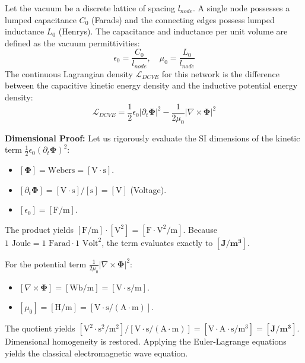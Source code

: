 \documentclass[11pt,a4paper]{article}
\begin{document}
Let the vacuum be a discrete lattice of spacing $l_{node}$. A single node possesses a lumped capacitance $C_0$ (Farads) and the connecting edges possess lumped inductance $L_0$ (Henrys). The capacitance and inductance per unit volume are defined as the vacuum permittivities:
\begin{equation}
    \epsilon_0 = \frac{C_0}{l_{node}}, \quad \mu_0 = \frac{L_0}{l_{node}}
\end{equation}
The continuous Lagrangian density $\mathcal{L}_{DCVE}$ for this network is the difference between the capacitive kinetic energy density and the inductive potential energy density:
\begin{equation}
    \mathcal{L}_{DCVE} = \frac{1}{2} \epsilon_0 |\partial_t \mathbf{\Phi}|^2 - \frac{1}{2\mu_0} |\nabla \times \mathbf{\Phi}|^2
\end{equation}

\textbf{Dimensional Proof:}
Let us rigorously evaluate the SI dimensions of the kinetic term $\frac{1}{2} \epsilon_0 (\partial_t \mathbf{\Phi})^2$:
\begin{itemize}
    \item $[\mathbf{\Phi}] = \text{Webers} = [\text{V} \cdot \text{s}]$.
    \item $[\partial_t \mathbf{\Phi}] = [\text{V} \cdot \text{s}] / [\text{s}] = [\text{V}]$ (Voltage).
    \item $[\epsilon_0] = [\text{F}/\text{m}]$.
\end{itemize}
The product yields $[\text{F}/\text{m}] \cdot [\text{V}^2] = [\text{F} \cdot \text{V}^2 / \text{m}]$. Because $1 \text{ Joule} = 1 \text{ Farad} \cdot 1 \text{ Volt}^2$, the term evaluates exactly to $\mathbf{[\text{J} / \text{m}^3]}$. 

For the potential term $\frac{1}{2\mu_0}|\nabla \times \mathbf{\Phi}|^2$:
\begin{itemize}
    \item $[\nabla \times \mathbf{\Phi}] = [\text{Wb}/\text{m}] = [\text{V} \cdot \text{s} / \text{m}]$.
    \item $[\mu_0] = [\text{H}/\text{m}] = [\text{V} \cdot \text{s} / (\text{A} \cdot \text{m})]$.
\end{itemize}
The quotient yields $[\text{V}^2 \cdot \text{s}^2 / \text{m}^2] / [\text{V} \cdot \text{s} / (\text{A} \cdot \text{m})] = [\text{V} \cdot \text{A} \cdot \text{s} / \text{m}^3] = \mathbf{[\text{J} / \text{m}^3]}$. Dimensional homogeneity is restored. Applying the Euler-Lagrange equations yields the classical electromagnetic wave equation.
\end{document}
